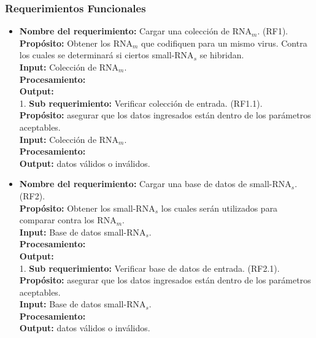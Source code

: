\documentclass[12pt,a4paper,spanish]{article}
\begin{document}
	\subsubsection{Requerimientos Funcionales}
	\begin{itemize}
		\item \textbf{Nombre del requerimiento:} Cargar una colección de RNA$_m$. (RF1).\\
 	    \textbf{Propósito:} Obtener los RNA$_m$ que codifiquen para un mismo virus. Contra los cuales se determinará si 								ciertos small-RNA$_s$ se hibridan.\\
		\textbf{Input:} Colección de RNA$_m$.\\
		\textbf{Procesamiento:} \\
		\textbf{Output:} \\

		1. \textbf{Sub requerimiento:} Verificar colección de entrada. (RF1.1).\\
 	    \textbf{Propósito:} asegurar que los datos ingresados están dentro de los parámetros aceptables. \\						
		\textbf{Input:} Colección de RNA$_m$.\\
		\textbf{Procesamiento:} \\
		\textbf{Output:} datos válidos o inválidos.\\

		\vskip 1cm
		\item \textbf{Nombre del requerimiento:} Cargar una base de datos de small-RNA$_s$. (RF2).\\
 	    \textbf{Propósito:} Obtener los small-RNA$_s$ los cuales serán utilizados para comparar contra los RNA$_m$.\\
		\textbf{Input:} Base de datos small-RNA$_s$.\\
		\textbf{Procesamiento:} \\
		\textbf{Output:} \\
	
		1. \textbf{Sub requerimiento:} Verificar base de datos de entrada. (RF2.1).\\
 	    \textbf{Propósito:} asegurar que los datos ingresados están dentro de los parámetros aceptables. \\
		\textbf{Input:} Base de datos small-RNA$_s$.\\
		\textbf{Procesamiento:} \\
		\textbf{Output:} datos válidos o inválidos.\\


\end{itemize}
\end{document}

